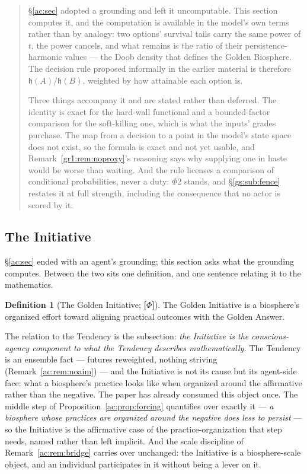 \documentclass[11pt]{article}
\numberwithin{equation}{section}
\theoremstyle{plain}
\theoremstyle{definition}
\newtheorem{definition}[theorem]{Definition}
\theoremstyle{remark}
\newcommand{\hm}{\mathfrak{h}}
\begin{document}
\begin{quote}\small
\S\ref{ac:sec} adopted a grounding and left it uncomputable. This section
computes it, and the computation is available in the model's own terms
rather than by analogy: two options' survival tails carry the same power
of $t$, the power cancels, and what remains is the ratio of their
persistence-harmonic values --- the Doob density that defines the Golden
Biosphere. The decision rule proposed informally in the earlier material
is therefore $\hm(A)/\hm(B)$, weighted by how attainable each option is.

Three things accompany it and are stated rather than deferred. The
identity is exact for the hard-wall functional and a bounded-factor
comparison for the soft-killing one, which is what the inputs' grades
purchase. The map from a decision to a point in the model's state space
does not exist, so the formula is exact and not yet usable, and
Remark~\ref{gr1:rem:noproxy}'s reasoning says why supplying one in haste would
be worse than waiting. And the rule licenses a comparison of conditional
probabilities, never a duty: $\Phi2$ stands, and \S\ref{gs:sub:fence}
restates it at full strength, including the consequence that no actor is
scored by it.
\end{quote}

\subsection{The Initiative}\label{gs:sub:initiative}

\S\ref{ac:sec} ended with an agent's grounding; this section asks what the grounding computes. Between the two sits one definition, and one sentence relating it to the mathematics.

\begin{definition}[The Golden Initiative; \textbf{[$\Phi$]}]\label{gs:def:initiative}
The Golden Initiative is a biosphere's organized effort toward aligning practical outcomes with the Golden Answer.
\end{definition}

The relation to the Tendency is the subsection: \emph{the Initiative is the conscious-agency component to what the Tendency describes mathematically.} The Tendency is an ensemble fact --- futures reweighted, nothing striving (Remark~\ref{ac:rem:noaim}) --- and the Initiative is not its cause but its agent-side face: what a biosphere's practice looks like when organized around the affirmative rather than the negative. The paper has already consumed this object once. The middle step of Proposition~\ref{ac:prop:forcing} quantifies over exactly it --- \emph{a biosphere whose practices are organized around the negative does less to persist} --- so the Initiative is the affirmative case of the practice-organization that step needs, named rather than left implicit. And the scale discipline of Remark~\ref{ac:rem:bridge} carries over unchanged: the Initiative is a biosphere-scale object, and an individual participates in it without being a lever on it.
\end{document}
